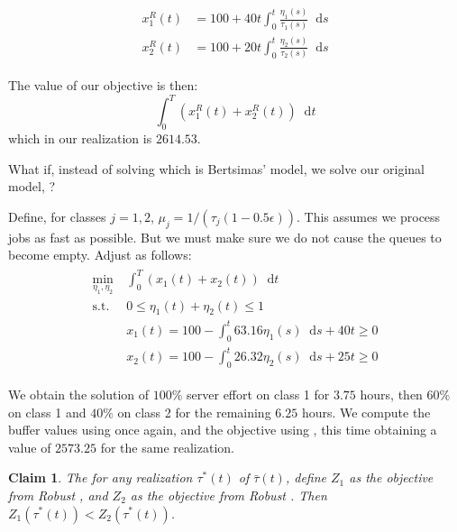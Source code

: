 \documentclass[11pt,a4paper,titlepage]{article}
\newcommand*{\dd}{\ensuremath{\mathop{}\!\mathrm{d}}}%
\theoremstyle{definition}
\theoremstyle{plain}
\newtheorem{claim}{Claim}
\begin{document}
\begin{align}
\label{eq:buffer-robust-realization}
\begin{split}
    x_1^R (t) &= 100 + 40 t \int_0^t \frac{\eta_1(s)}{\tau_1(s)} \dd s \\
    x_2^R (t) &= 100 + 20 t \int_0^t \frac{\eta_2(s)}{\tau_2(s)} \dd s
\end{split}
\end{align}

The value of our objective is then:
\begin{equation}
    \label{eq:cost-robust-realization}
    \int_0^T \left( x_1^R(t) + x_2^R(t) \right) \dd t
\end{equation}
which in our realization is $2614.53$.

What if,
instead of solving \modeltwo which is Bertsimas' model,
we solve our original model,
\modelone?

Define,
for classes $j=1,2$,
$\mu_j=1/(\tau_j ( 1 - 0.5 \epsilon))$.
This assumes we process jobs as fast as possible.
But we must make sure we do not cause the queues to become empty.
Adjust \modelone as follows:
\begin{align}
    \label{eq:model-1-robust}
    \begin{split}
        \min\limits_{\eta_1, \eta_2}
        &~ \int_0^T \left( x_1(t) + x_2(t) \right) \dd t \\
        \text{s.t.}
        &~ 0 \leq \eta_1(t) + \eta_2(t) \leq 1 \\
        &~ x_1(t) = 100 - \int_0^t 63.16 \eta_1(s) \dd s + 40t \geq 0 \\
        &~ x_2(t) = 100 - \int_0^t 26.32 \eta_2(s) \dd s + 25t \geq 0
    \end{split}
\end{align}

We obtain the solution of $100\%$ server effort on class 1 for $3.75$ hours,
then $60\%$ on class 1 and $40\%$ on class 2 for the remaining $6.25$ hours.
We compute the buffer values using  once again,
and the objective using ,
this time obtaining a value of $2573.25$ for the same realization.

\begin{claim}
    The for any realization $\tau^*(t)$ of $\bar{\tau}(t)$,
    define $Z_1$ as the objective from Robust \modelone,
    and $Z_2$ as the objective from Robust \modeltwo.
    Then $Z_1(\tau^*(t)) < Z_2(\tau^*(t))$.
\end{claim}
\end{document}
